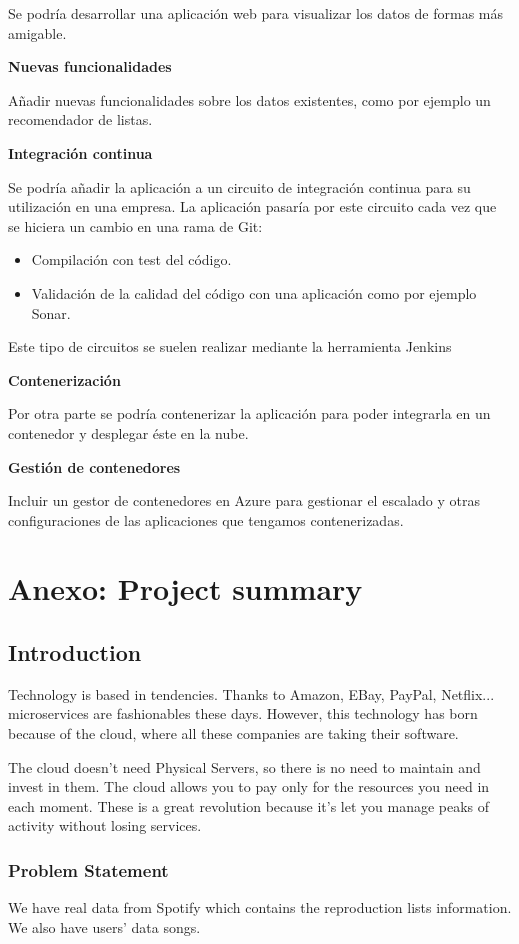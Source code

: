 \documentclass[12pt]{report} %
\begin{document}
Se podría desarrollar una aplicación web para visualizar los datos de formas más amigable.

\textbf{Nuevas funcionalidades}

Añadir nuevas funcionalidades sobre los datos existentes, como por ejemplo un recomendador de listas.

\textbf{Integración continua}

Se podría añadir la aplicación a un circuito de integración continua para su utilización en una empresa.
La aplicación pasaría por este circuito cada vez que se hiciera un cambio en una rama de Git:
\begin{itemize}
	\item Compilación con test del código.
	\item Validación de la calidad del código con una aplicación como por ejemplo Sonar.
\end{itemize}

Este tipo de circuitos se suelen realizar mediante la herramienta Jenkins

\textbf{Contenerización}

Por otra parte se podría contenerizar la aplicación para poder integrarla en un contenedor y desplegar éste en la nube.

\textbf{Gestión de contenedores}

Incluir un gestor de contenedores en Azure para gestionar el escalado y otras configuraciones de las aplicaciones que tengamos contenerizadas.


\chapter{Anexo: Project summary}

\section{Introduction}
Technology is based in tendencies. Thanks to Amazon, EBay, PayPal, Netflix... microservices are fashionables these days. However, this technology has born because of the cloud, where all these companies are taking their software.

The cloud doesn’t need Physical Servers, so there is no need to maintain and invest in them. The cloud allows you to pay only for the resources you need in each moment. These is a great revolution because it’s let you manage peaks of activity without losing services.


\subsection{Problem Statement}
We have real data from Spotify which contains the reproduction lists information. We also have users’ data songs.
\end{document}
